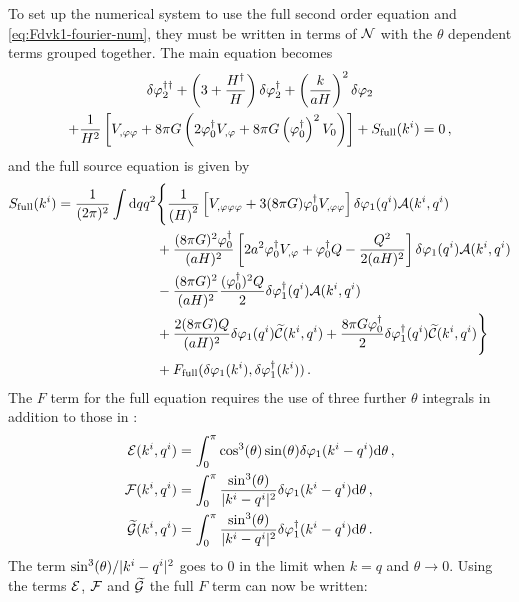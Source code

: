 To set up the numerical system to use the full second order equation
 and \eqref{eq:Fdvk1-fourier-num}, they must be written in
terms of $\mathcal{N}$ with the $\theta$ dependent terms grouped together. The main equation
becomes
\begin{multline}
 \label{eq:fullso-res}
\ddN{\dvp2} + \left(3 + \frac{\dN{H}}{H}\right) \dN{\dvp2} +
\left(\frac{k}{aH}\right)^2 \dvp2 \\
% 
+ \frac{1}{H^2}\left[ \Upp + 8\pi G\left(2\dN{\vp_0}\Uphi + 8\pi G
\left(\dN{\vp_0}\right)^2 \U \right)\right] 
% 
+ S_\mathrm{full}(\kvi) = 0\,,
\end{multline}
% 
and the full source equation is given by
% 
\begin{align}
\label{eq:fullsrc-res}
S_\mathrm{full}(\kvi) = \frac{1}{(2\pi)^2}\int \d q q^2 &\Bigg\{ 
% 
\frac{1}{\left(H\right)^2} \left[ \Uppp + 3(8\pi G)\dN{\vp_0}\Upp\right]
 \dvp1(\qvi) \A(\kvi, \qvi) \nonumber \\
% 
&+\frac{(8\pi G)^2 \dN{\vp_0}}{(aH)^2}\left[ 2a^2\dN{\vp_0}\Uphi +\dN{\vp_0}Q
-\frac{Q^2}{2(aH)^2}\right] \dvp1(\qvi) \A(\kvi, \qvi) \nonumber \\
% 
&- \frac{(8\pi G)^2}{(aH)^2}\frac{(\dN{\vp_0})^2 Q}{2} \dN{\dvp1}(\qvi)
\A(\kvi, \qvi) \nonumber \\
% 
&+ \frac{2(8\pi G)Q}{(aH)^2} \dvp1(\qvi)\wt{\C}(\kvi, \qvi) 
% 
+ \frac{8\pi G \dN{\vp_0}}{2} \dN{\dvp1}(\qvi) \wt{\C}(\kvi, \qvi) \Bigg\} \nonumber
\\
% 
&+ F_\mathrm{full}(\dvp1(\kvi), \dN{\dvp1}(\kvi))\,.
\end{align}
% 
The $F$ term for the full equation requires the use of three further $\theta$
integrals in addition to those in :
% 
\begin{align}
\label{eq:efg-terms-res}
 \E(\kvi, \qvi) &= \int_0^\pi \cos^3(\theta) \sin(\theta) \dvp1(\kvi-\qvi)\d \theta
\,,\nonumber \\
% 
\F(\kvi, \qvi) &= \int_0^\pi \frac{\sin^3(\theta)}{|\kvi-\qvi|^2} \dvp1(\kvi-\qvi)\d
\theta \,,\nonumber \\
% 
\wt{\G}(\kvi, \qvi) &= \int_0^\pi \frac{\sin^3(\theta)}{|\kvi-\qvi|^2}
\dN{\dvp1}(\kvi-\qvi)\d \theta \,.
\end{align}
% 
The term $\sin^3(\theta)/|k^i-q^i|^2$ goes to $0$ in the limit when $k=q$ and
$\theta\rightarrow 0$.
% 
Using the terms $\mathcal{E}$, $\mathcal{F}$ and $\widetilde{\mathcal{G}}$ the full $F$ term can now be written:
